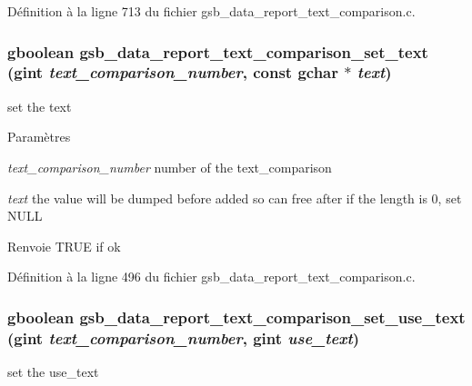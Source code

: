 Définition à la ligne 713 du fichier gsb\_\-data\_\-report\_\-text\_\-comparison.c.

\subsubsection[{gsb\_\-data\_\-report\_\-text\_\-comparison\_\-set\_\-text}]{\setlength{\rightskip}{0pt plus 5cm}gboolean gsb\_\-data\_\-report\_\-text\_\-comparison\_\-set\_\-text (gint {\em text\_\-comparison\_\-number}, \/  const gchar $\ast$ {\em text})}\label{gsb__data__report__text__comparison_8h_a4a76cff1d6c257cea41c735a4480afe8}
set the text


\begin{DoxyParams}{Paramètres}
\item[{\em text\_\-comparison\_\-number}]number of the text\_\-comparison \item[{\em text}]the value will be dumped before added so can free after if the length is 0, set NULL\end{DoxyParams}
\begin{DoxyReturn}{Renvoie}
TRUE if ok 
\end{DoxyReturn}


Définition à la ligne 496 du fichier gsb\_\-data\_\-report\_\-text\_\-comparison.c.

\subsubsection[{gsb\_\-data\_\-report\_\-text\_\-comparison\_\-set\_\-use\_\-text}]{\setlength{\rightskip}{0pt plus 5cm}gboolean gsb\_\-data\_\-report\_\-text\_\-comparison\_\-set\_\-use\_\-text (gint {\em text\_\-comparison\_\-number}, \/  gint {\em use\_\-text})}\label{gsb__data__report__text__comparison_8h_a9cff82d129475de66e8e4fbe78ff569c}
set the use\_\-text


